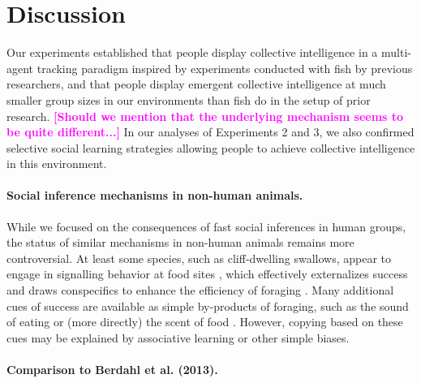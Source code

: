 \documentclass[12pt,letterpaper]{article}
\newcommand{\andrew}[1]{\textcolor{magenta}{\bf [#1]}}
\begin{document}
\section{Discussion}

Our experiments established that people display collective intelligence in a multi-agent tracking paradigm inspired by experiments conducted with fish by previous researchers, and that people display emergent collective intelligence at much smaller group sizes in our environments than fish do in the setup of prior research. \andrew{Should we mention that the underlying mechanism seems to be quite different...}  In our analyses of Experiments 2 and 3, we also confirmed selective social learning strategies allowing people to achieve collective intelligence in this environment.

\paragraph{Social inference mechanisms in non-human animals.}


While we focused on the consequences of fast social inferences in human groups, the status of similar mechanisms in non-human animals remains more controversial.
At least some species, such as cliff-dwelling swallows, appear to engage in signalling behavior at food sites \cite{brown1988social,brown1991food}, which effectively externalizes success and draws conspecifics to enhance the efficiency of foraging \cite{torney2011signalling}.
Many additional cues of success are available as simple by-products of foraging, such as the sound of eating or (more directly) the scent of food \cite{galef2001social}.
However, copying based on these cues may be explained by associative learning or other simple biases.

\paragraph{Comparison to Berdahl et al. (2013).}
\end{document}
